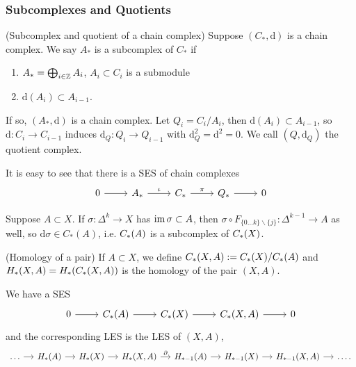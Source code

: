 \documentclass[a4paper,11pt]{article}
\begin{document}
			\subsubsection*{Subcomplexes and Quotients}
				\begin{defi}(Subcomplex and quotient of a chain complex)
					Suppose $(C_\ast,\mathrm{d})$ is a chain complex. We say $A_\ast$ is a subcomplex of $C_\ast$ if
					\begin{enumerate}
						\item $A_\ast=\bigoplus_{i\in\mathbb{Z}}A_i$, $A_i\subset C_i$ is a submodule
						\item $\mathrm{d}(A_i)\subset A_{i-1}$.
					\end{enumerate}
					If so, $(A_\ast,\mathrm{d})$ is a chain complex. Let $Q_i=C_{i}/A_{i}$, then $\mathrm{d}(A_{i})\subset A_{i-1}$, so $\mathrm{d}:C_i \rightarrow C_{i-1}$ induces $\mathrm{d}_{Q}:Q_{i}\rightarrow Q_{i-1}$ with $\mathrm{d}_{Q}^2=\mathrm{d}^2=0$. We call $(Q,\mathrm{d}_{Q})$ the quotient complex.
				\end{defi}

				It is easy to see that there is a SES of chain complexes 
				\begin{equation*}
					\begin{tikzcd}[]
						0\ar[r] & A_\ast \ar[r,"\iota"] & C_\ast\ar[r,"\pi"] & Q_\ast\ar[r] & 0
					\end{tikzcd}
				\end{equation*}

				\begin{eg}
					Suppose $A\subset X$. If $\sigma:\Delta^k \rightarrow X$ has $\operatorname{im} \sigma\subset A$, then $\sigma\circ F_{\{0\dots k\}\backslash\{j\}}:\Delta^{k-1}\rightarrow A$ as well, so $\mathrm{d}\sigma\in C_{\ast}(A)$, i.e. $C_{\ast}(A)$ is a subcomplex of $C_{\ast}(X)$.
				\end{eg}

				\begin{defi}(Homology of a pair)
					If $A\subset X$, we define $C_{\ast}(X,A):=C_{\ast}(X)/C_{\ast}(A)$ and $H_{\ast}(X,A)=H_{\ast}(C_{\ast}(X,A))$ is the homology of the pair $(X,A)$.
				\end{defi}

				We have a SES
				\begin{equation*}
					\begin{tikzcd}
						0\ar[r] & \cx{A}\ar[r] & \cx{X}\ar[r]& \cx{X,A}\ar[r] & 0
					\end{tikzcd}
				\end{equation*}
				and the corresponding LES is the LES of $(X,A)$,
				\begin{equation*}
					\begin{tikzcd}[column sep=small]
						\dots\ar[r]& \hg{A}\ar[r]& \hg{X}\ar[r]& \hg{X,A}\ar[r,"\partial"]& \hg[\ast-1]{A}\ar[r]& \hg[\ast-1]{X}\ar[r]& \hg[\ast-1]{X,A}\ar[r]& \dots .
					\end{tikzcd}
				\end{equation*}
\end{document}
